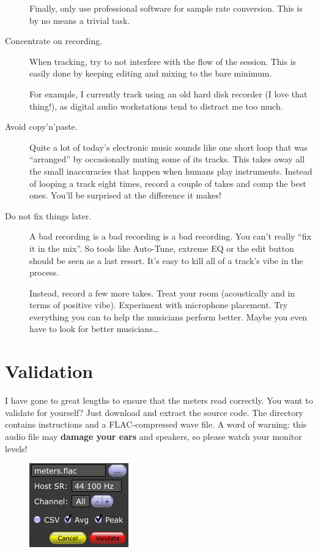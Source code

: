 \begin{description}
  Finally, only use professional software for sample rate conversion.
  This is by no means a trivial task.

\item[Concentrate on recording.]  When tracking, try to not interfere
  with the flow of the session.  This is easily done by keeping
  editing and mixing to the bare minimum.

  For example, I currently track using an old hard disk recorder (I
  love that thing!), as digital audio workstations tend to distract me
  too much.

\item[Avoid copy'n'paste.]  Quite a lot of today's electronic music
  sounds like one short loop that was ``arranged'' by occasionally
  muting some of its tracks.  This takes away all the small
  inaccuracies that happen when humans play instruments.  Instead of
  looping a track eight times, record a couple of takes and comp the
  best ones.  You'll be surprised at the difference it makes!

\item[Do not fix things later.]  A bad recording is a bad recording is
  a bad recording.  You can't really ``fix it in the mix''.  So tools
  like Auto-Tune, extreme EQ or the edit button should be seen as a
  last resort.  It's easy to kill all of a track's vibe in the
  process.

  Instead, record a few more takes.  Treat your room (acoustically and
  in terms of positive vibe).  Experiment with microphone placement.
  Try everything you can to help the musicians perform better.  Maybe
  you even have to look for better musicians\dots

\end{description}

\chapter{Validation}
\label{chap:validation}

I have gone to great lengths to ensure that the meters read correctly.
You want to validate for yourself?  Just download and extract the
source code.  The directory  contains instructions
and a FLAC-compressed wave file.  A word of warning: this audio file
may \textbf{damage your ears} and speakers, so please watch your
monitor levels!

\begin{figure}
  \includegraphics[scale=0.65,clip]{include/images/dialog_validation.png}
\end{figure}

